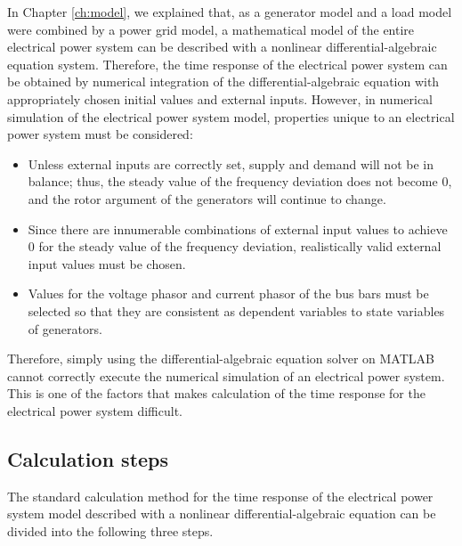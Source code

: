 \documentclass[tombow,dvipdfmx]{corona-a5-1.1}
\begin{document}
In Chapter \ref{ch:model}, we explained that, as a generator model and a load model were combined by a power grid model,
a mathematical model of the entire electrical power system can be described with a nonlinear differential-algebraic equation system.
Therefore, the time response of the electrical power system can be obtained by numerical integration of the differential-algebraic equation with appropriately chosen initial values and external inputs.
However, in numerical simulation of the electrical power system model, properties unique to an electrical power system must be considered:
\begin{itemize}	
  \item Unless external inputs are correctly set, supply and demand will not be in balance; thus, the steady value of the frequency deviation does not become 0, and the rotor argument of the generators will continue to change.
	\item Since there are innumerable combinations of external input values to achieve 0 for the steady value of the frequency deviation, realistically valid external input values must be chosen.
	\item Values for the voltage phasor and current phasor of the bus bars must be selected so that they are consistent as dependent variables to state variables of generators.
\end{itemize}
Therefore, simply using the differential-algebraic equation solver on MATLAB cannot correctly execute the numerical simulation of an electrical power system.
This is one of the factors that makes calculation of the time response for the electrical power system difficult.

\subsection{Calculation steps}\label{sec:numstep}

The standard calculation method for the time response of the electrical power system model described with a nonlinear differential-algebraic equation can be divided into the following three steps.
\end{document}
